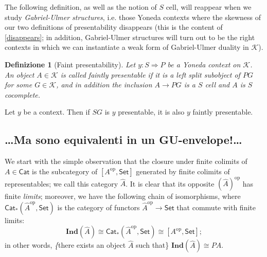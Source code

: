 \documentclass[11pt]{article}
\def\Cat{\mathsf{Cat}}
\def\Set{\mathsf{Set}}
\def\To{\Rightarrow}
\def\opp{\mathrm{op}}
\theoremstyle{reference}
\newtheorem{definition}[theorem]{Definizione}
\begin{document}
The following definition, as well as the notion of \(S\) cell, will reappear when we study \emph{Gabriel-Ulmer structures}, i.e. those Yoneda contexts where the skewness of our two definitions of presentability disappears (this is the content of \autoref{disappears}; in addition, Gabriel-Ulmer structures will turn out to be the right contexts in which we can instantiate a weak form of Gabriel-Ulmer duality in \(\mathcal K\)).
\begin{definition}[Faint presentability]
	Let $y : S\To  P$ be a Yoneda context on $\mathcal K$. An object $A\in\mathcal K$ is called \emph{faintly presentable} if it is a left split subobject of $ P G$ for some $G\in\mathcal K$, and in addition the inclusion $A\to  P G$ is a $S$ cell and $A$ is $S$ cocomplete.
\end{definition}
\begin{prop}
Let \(y\) be a context. Then if \(S G\) is \(y\) presentable, it is also \(y\) faintly presentable.


\subsection{\ldots{}Ma sono equivalenti in un GU-envelope!\ldots{}}
\label{sec:orga7b0bc4}

We start with the simple observation that the closure under finite colimits of \(A\in\Cat\) is the subcategory of \([A^\opp,\Set]\) generated by finite colimits of representables; we call this category \(\widehat A\). It is clear that its opposite \((\widehat{A})^\opp\) has finite \emph{limits}; moreover, we have the following chain of isomorphisms, where \(\Cat_*(\widehat{A}^\opp,\Set)\) is the category of functors \(\widehat{A}^\opp\to \Set\) that commute with finite limits:
\[
	\boldsymbol{Ind}(\widehat{A}) \cong \Cat_*(\widehat{A}^\opp,\Set)\cong [A^\opp,\Set];
\]
in other words, \emph\{there exists an object \(\widehat{A}\) such that\} \(\boldsymbol{Ind}(\widehat A)\cong P A\).


\end{prop}
\end{document}

